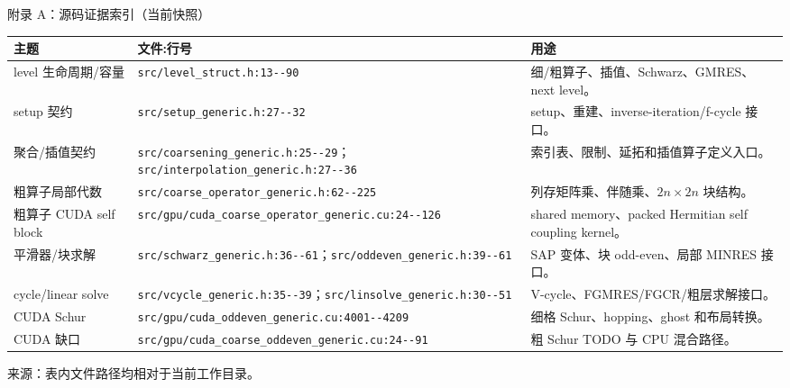 \documentclass[UTF8,aspectratio=169,11pt]{ctexbeamer}
\newcommand{\source}[1]{%
  \vspace{0.06em}\par{\raggedright\scriptsize\color{muted}来源：#1\par}}
\newcommand{\code}[1]{\nolinkurl{#1}}
\newcommand{\denseframe}{%
  \footnotesize
  \setlength{\tabcolsep}{2.5pt}%
  \renewcommand{\arraystretch}{0.76}%
}
\begin{document}
\begin{frame}[t]{附录 A：源码证据索引（当前快照）}
  \denseframe
  \scriptsize
  \begin{tabularx}{0.96\textwidth}{@{}p{}p{}Y@{}}
    \toprule
    主题 & 文件:行号 & 用途 \\
    \midrule
    level 生命周期/容量 & \code{src/level_struct.h:13--90} & 细/粗算子、插值、Schwarz、GMRES、next level。 \\
    setup 契约 & \code{src/setup_generic.h:27--32} & setup、重建、inverse-iteration/f-cycle 接口。 \\
    聚合/插值契约 & \code{src/coarsening_generic.h:25--29}；\code{src/interpolation_generic.h:27--36} & 索引表、限制、延拓和插值算子定义入口。 \\
    粗算子局部代数 & \code{src/coarse_operator_generic.h:62--225} & 列存矩阵乘、伴随乘、$2n\times2n$ 块结构。 \\
    粗算子 CUDA self block & \code{src/gpu/cuda_coarse_operator_generic.cu:24--126} & shared memory、packed Hermitian self coupling kernel。 \\
    平滑器/块求解 & \code{src/schwarz_generic.h:36--61}；\code{src/oddeven_generic.h:39--61} & SAP 变体、块 odd-even、局部 MINRES 接口。 \\
    cycle/linear solve & \code{src/vcycle_generic.h:35--39}；\code{src/linsolve_generic.h:30--51} & V-cycle、FGMRES/FGCR/粗层求解接口。 \\
    CUDA Schur & \code{src/gpu/cuda_oddeven_generic.cu:4001--4209} & 细格 Schur、hopping、ghost 和布局转换。 \\
    CUDA 缺口 & \code{src/gpu/cuda_coarse_oddeven_generic.cu:24--91} & 粗 Schur TODO 与 CPU 混合路径。 \\
    \bottomrule
  \end{tabularx}
  \source{表内文件路径均相对于当前工作目录。}
\end{frame}
\end{document}
